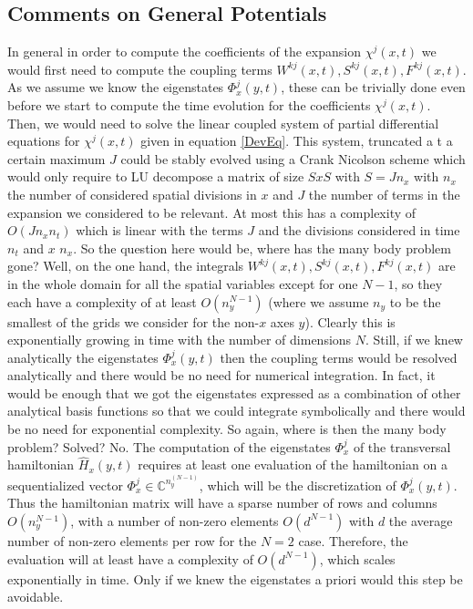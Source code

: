 \documentclass[11pt, a4paper]{article} %
\newcommand{\C}{\mathbb{C}}
\begin{document}
\subsection{Comments on General Potentials}
In general in order to compute the coefficients of the expansion $\chi^j(x,t)$ we would first need to compute the coupling terms $W^{kj}(x,t),S^{kj}(x,t),F^{kj}(x,t)$. As we assume we know the eigenstates $\Phi^j_x(y,t)$, these can be trivially done even before we start to compute the time evolution for the coefficients $\chi^j(x,t)$. Then, we would need to solve the linear coupled system of partial differential equations for $\chi^j(x,t)$ given in equation \eqref{DevEq}. This system, truncated a t a certain maximum $J$ could be stably evolved using a Crank Nicolson scheme which would only require to LU decompose a matrix of size $SxS$ with $S=Jn_{x}$ with $n_x$ the number of considered spatial divisions in $x$ and $J$ the number of terms in the expansion we considered to be relevant. At most this has a complexity of $O(Jn_xn_t)$ which is linear with the terms $J$ and the divisions considered in time $n_t$ and $x$ $n_x$. So the question here would be, where has the many body problem gone? Well, on the one hand, the integrals $W^{kj}(x,t),S^{kj}(x,t),F^{kj}(x,t)$ are in the whole domain for all the spatial variables except for one $N-1$, so they each have a complexity of at least $O(n_y^{N-1})$ (where we assume $n_y$ to be the smallest of the grids we consider for the non-$x$ axes $y$). Clearly this is exponentially growing in time with the number of dimensions $N$. Still, if we knew analytically the eigenstates $\Phi^j_x(y,t)$ then the coupling terms would be resolved analytically and there would be no need for numerical integration. In fact, it would be enough that we got the eigenstates expressed as a combination of other analytical basis functions so that we could integrate symbolically and there would be no need for exponential complexity. So again, where is then the many body problem? Solved? No. The computation of the eigenstates $\Phi^j_x$ of the transversal hamiltonian $\hat{H}_x(y,t)$ requires at least one evaluation of the hamiltonian on a sequentialized vector $\Phi^j_x\in\C^{n_y^(N-1)}$, which will be the discretization of $\Phi^j_x(y,t)$. Thus the hamiltonian matrix will have a sparse number of rows and columns $O(n_y^{N-1})$, with a number of non-zero elements $O(d^{N-1})$ with $d$ the average number of non-zero elements per row for the $N=2$ case. Therefore, the evaluation will at least have a complexity of $O(d^{N-1})$, which scales exponentially in time. Only if we knew the eigenstates a priori would this step be avoidable.
\end{document}
